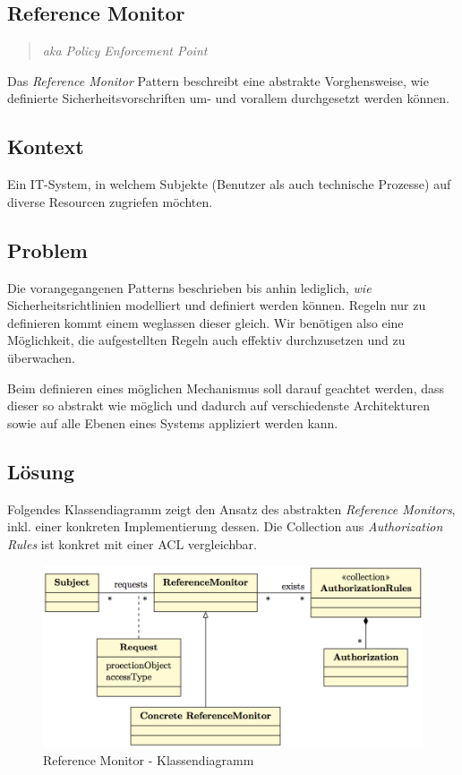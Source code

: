 \subsection{Reference Monitor}

\begin{quote}\emph{aka Policy Enforcement Point}\end{quote}

Das \emph{Reference Monitor} Pattern beschreibt eine abstrakte Vorghensweise, wie definierte Sicherheitsvorschriften um- und vorallem durchgesetzt werden können.

\subsection*{Kontext}
Ein IT-System, in welchem Subjekte (Benutzer als auch technische Prozesse) auf diverse Resourcen zugriefen möchten.

\subsection*{Problem}
Die vorangegangenen Patterns beschrieben bis anhin lediglich, \emph{wie} Sicherheitsrichtlinien modelliert und definiert werden können.
Regeln nur zu definieren kommt einem weglassen dieser gleich. Wir benötigen also eine Möglichkeit, die aufgestellten Regeln auch effektiv durchzusetzen und zu überwachen.

Beim definieren eines möglichen Mechanismus soll darauf geachtet werden, dass dieser so abstrakt wie möglich und dadurch auf verschiedenste Architekturen sowie auf alle Ebenen eines Systems appliziert werden kann.

\subsection*{Lösung}
Folgendes Klassendiagramm zeigt den Ansatz des abstrakten \emph{Reference Monitors}, inkl. einer konkreten Implementierung dessen.
Die Collection aus \emph{Authorization Rules} ist konkret mit einer \gls{ACL} vergleichbar.

\begin{figure}[H]
	\includegraphics[width=\textwidth]{content/security/accesscontrolmodels/images/referencemonitor.png}
\caption{Reference Monitor - Klassendiagramm}
\end{figure}

